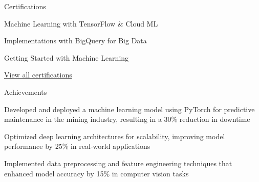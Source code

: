 \documentclass{resume} %
\begin{document}
    \begin{rSection}{Certifications}
        \begin{rSubsection}{}{}{}
                            \item Machine Learning with TensorFlow \& Cloud ML
                            \item Implementations with BigQuery for Big Data
                            \item Getting Started with Machine Learning
                    \end{rSubsection}
        \href{https://skillsoft.digitalbadges.skillsoft.com/profile/umairsaeed185770/wallet}{View all certifications}
    \end{rSection}

    \begin{rSection}{Achievements}
        \begin{rSubsection}{}{}{}
                            \item Developed and deployed a machine learning model using PyTorch for predictive maintenance in the mining industry, resulting in a 30\% reduction in downtime
                            \item Optimized deep learning architectures for scalability, improving model performance by 25\% in real{-}world applications
                            \item Implemented data preprocessing and feature engineering techniques that enhanced model accuracy by 15\% in computer vision tasks
                    \end{rSubsection}
    \end{rSection}
\end{document}
